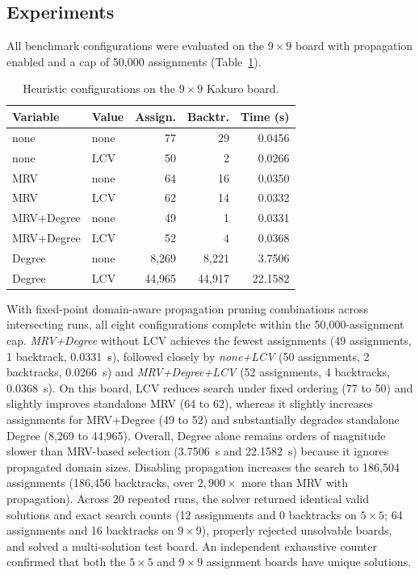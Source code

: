 \subsection{Experiments}
All benchmark configurations were evaluated on the $9\times9$ board with propagation enabled and a cap of 50{,}000 assignments (Table~\ref{tab:kakuro}).

\begin{table}[htbp]
\caption{Heuristic configurations on the $9\times9$ Kakuro board.}
\label{tab:kakuro}
\centering
\begin{tabular}{llrrr}
\hline
Variable & Value & Assign. & Backtr. & Time (s) \\
\hline
none       & none & 77       & 29       & 0.0456 \\
none       & LCV  & 50       & 2        & 0.0266 \\
MRV        & none & 64       & 16       & 0.0350 \\
MRV        & LCV  & 62       & 14       & 0.0332 \\
MRV+Degree & none & 49       & 1        & 0.0331 \\
MRV+Degree & LCV  & 52       & 4        & 0.0368 \\
Degree     & none & 8{,}269  & 8{,}221  & 3.7506 \\
Degree     & LCV  & 44{,}965 & 44{,}917 & 22.1582 \\
\hline
\end{tabular}
\end{table}

With fixed-point domain-aware propagation pruning combinations across intersecting runs, all eight configurations complete within the 50{,}000-assignment cap. \emph{MRV+Degree} without LCV achieves the fewest assignments (49 assignments, 1 backtrack, 0.0331~s), followed closely by \emph{none+LCV} (50 assignments, 2 backtracks, 0.0266~s) and \emph{MRV+Degree+LCV} (52 assignments, 4 backtracks, 0.0368~s). On this board, LCV reduces search under fixed ordering (77 to 50) and slightly improves standalone MRV (64 to 62), whereas it slightly increases assignments for MRV+Degree (49 to 52) and substantially degrades standalone Degree (8{,}269 to 44{,}965). Overall, Degree alone remains orders of magnitude slower than MRV-based selection (3.7506~s and 22.1582~s) because it ignores propagated domain sizes. Disabling propagation increases the search to 186{,}504 assignments (186{,}456 backtracks, over $2{,}900\times$ more than MRV with propagation). Across 20 repeated runs, the solver returned identical valid solutions and exact search counts (12 assignments and 0 backtracks on $5\times5$; 64 assignments and 16 backtracks on $9\times9$), properly rejected unsolvable boards, and solved a multi-solution test board. An independent exhaustive counter confirmed that both the $5\times5$ and $9\times9$ assignment boards have unique solutions.